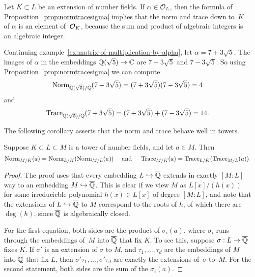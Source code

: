 \begin{remark}
  Let $K\subset L$ be an extension of number fields.  If
  $\alpha\in \mathcal{O}_L$, then the formula of
  Proposition~\ref{prop:normtracesigma} implies that the norm and trace
  down to~$K$ of $\alpha$ is an element of~$\mathcal{O}_K$, because the sum and
  product of algebraic integers is an algebraic integer.
\end{remark}

\begin{example}
	Continuing example~\ref{ex:matrix-of-multiplication-by-alpha},
	let $\alpha = 7 + 3\sqrt{5}$. The images of $\alpha$ in the embeddings
	$\mathbb{Q}(\sqrt{5}) \to \mathbb{C}$ are $7 + 3\sqrt{5}$ and $7 - 3\sqrt{5}$. So
	using Proposition~\ref{prop:normtracesigma} we can compute
	\[
		\operatorname{Norm}_{\mathbb{Q}(\sqrt{5})/\mathbb{Q}}(7 + 3\sqrt{5})
		=
		(7 + 3\sqrt{5})(7 - 3\sqrt{5})
		=
		4
	\]
	and
	\[
		\operatorname{Trace}_{\mathbb{Q}(\sqrt{5})/\mathbb{Q}}(7 + 3\sqrt{5})
		=
		(7 + 3\sqrt{5}) + (7 - 3\sqrt{5})
		=
		14.
	\]
\end{example}

The following corollary asserts that the norm and trace behave well in
towers.
\begin{corollary}
  \label{cor:compatower}
  Suppose $K\subset L \subset M$ is a tower of number fields, and
  let $a\in M$.  Then
  $$
    \operatorname{Norm}_{M/K}(a) = \operatorname{Norm}_{L/K}(\operatorname{Norm}_{M/L}(a))
    \quad\text{ and }\quad
    \operatorname{Trace}_{M/K}(a) = \operatorname{Trace}_{L/K}(\operatorname{Trace}_{M/L}(a)).
  $$
\end{corollary}
\begin{proof}
  The proof uses that every embedding $L \hookrightarrow \overline{\mathbb{Q}}$ extends in exactly
  $[M:L]$ way to an embedding $M \hookrightarrow \overline{\mathbb{Q}}$.  This is clear
  if we view $M$ as $L[x]/(h(x))$ for some irreducicble
  polynomial $h(x) \in L[x]$ of degree $[M:L]$, and note that
  the extensions of $L \hookrightarrow \overline{\mathbb{Q}}$ to $M$ correspond to
  the roots of $h$, of which there are $\deg(h)$, since $\overline{\mathbb{Q}}$
  is algebraically closed.

  For the first equation, both sides are the product of $\sigma_i(a)$,
  where $\sigma_i$ runs through the embeddings of~$M$ into $\overline{\mathbb{Q}}$
  that fix $K$.  To see this, suppose $\sigma:L\to \overline{\mathbb{Q}}$ fixes $K$.
  If $\sigma'$ is an extension of $\sigma$ to $M$, and $\tau_1,\dots,
  \tau_d$ are the embeddings of $M$ into $\overline{\mathbb{Q}}$ that fix $L$, then
  $\sigma'\tau_1,\dots,\sigma'\tau_d$ are exactly the extensions
  of~$\sigma$ to~$M$.  For the second statement, both sides are the
  sum of the $\sigma_i(a)$.
\end{proof}

